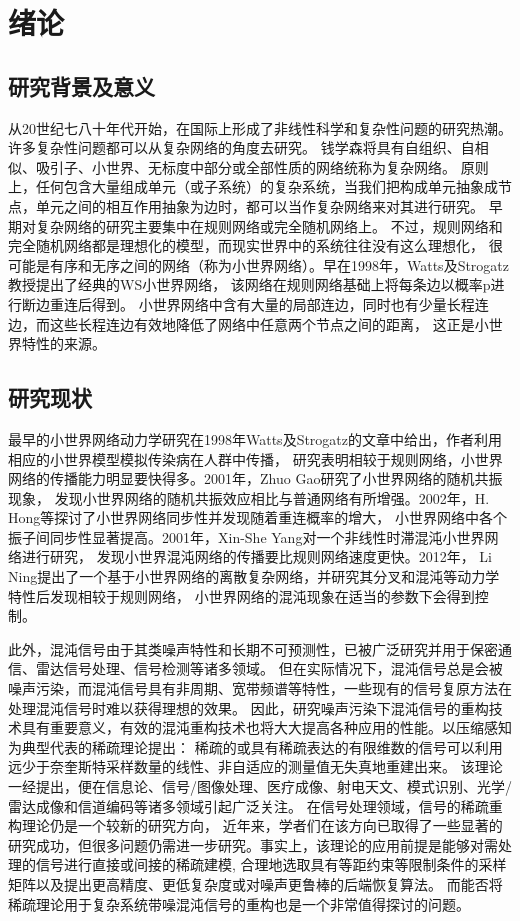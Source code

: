 \chapter{绪论}
\section{研究背景及意义}
从20世纪七八十年代开始，在国际上形成了非线性科学和复杂性问题的研究热潮。许多复杂性问题都可以从复杂网络的角度去研究。
钱学森将具有自组织、自相似、吸引子、小世界、无标度中部分或全部性质的网络统称为复杂网络。
原则上，任何包含大量组成单元（或子系统）的复杂系统，当我们把构成单元抽象成节点，单元之间的相互作用抽象为边时，都可以当作复杂网络来对其进行研究。
早期对复杂网络的研究主要集中在规则网络或完全随机网络上。
不过，规则网络和完全随机网络都是理想化的模型，而现实世界中的系统往往没有这么理想化，
很可能是有序和无序之间的网络（称为小世界网络）。早在1998年，Watts及Strogatz教授提出了经典的WS小世界网络，
该网络在规则网络基础上将每条边以概率p进行断边重连后得到。
小世界网络中含有大量的局部连边，同时也有少量长程连边，而这些长程连边有效地降低了网络中任意两个节点之间的距离，
这正是小世界特性的来源。
\section{研究现状}
最早的小世界网络动力学研究在1998年Watts及Strogatz的文章中给出，作者利用相应的小世界模型模拟传染病在人群中传播，
研究表明相较于规则网络，小世界网络的传播能力明显要快得多。2001年，Zhuo Gao研究了小世界网络的随机共振现象，
发现小世界网络的随机共振效应相比与普通网络有所增强。2002年，H. Hong等探讨了小世界网络同步性并发现随着重连概率的增大，
小世界网络中各个振子间同步性显著提高。2001年，Xin-She Yang对一个非线性时滞混沌小世界网络进行研究，
发现小世界混沌网络的传播要比规则网络速度更快。2012年，
Li Ning提出了一个基于小世界网络的离散复杂网络，并研究其分叉和混沌等动力学特性后发现相较于规则网络，
小世界网络的混沌现象在适当的参数下会得到控制。

此外，混沌信号由于其类噪声特性和长期不可预测性，已被广泛研究并用于保密通信、雷达信号处理、信号检测等诸多领域。
但在实际情况下，混沌信号总是会被噪声污染，而混沌信号具有非周期、宽带频谱等特性，一些现有的信号复原方法在处理混沌信号时难以获得理想的效果。
因此，研究噪声污染下混沌信号的重构技术具有重要意义，有效的混沌重构技术也将大大提高各种应用的性能。以压缩感知为典型代表的稀疏理论提出：
稀疏的或具有稀疏表达的有限维数的信号可以利用远少于奈奎斯特采样数量的线性、非自适应的测量值无失真地重建出来。
该理论一经提出，便在信息论、信号/图像处理、医疗成像、射电天文、模式识别、光学/雷达成像和信道编码等诸多领域引起广泛关注。
在信号处理领域，信号的稀疏重构理论仍是一个较新的研究方向，
近年来，学者们在该方向已取得了一些显著的研究成功，但很多问题仍需进一步研究。事实上，该理论的应用前提是能够对需处理的信号进行直接或间接的稀疏建模, 
合理地选取具有等距约束等限制条件的采样矩阵以及提出更高精度、更低复杂度或对噪声更鲁棒的后端恢复算法。
而能否将稀疏理论用于复杂系统带噪混沌信号的重构也是一个非常值得探讨的问题。

